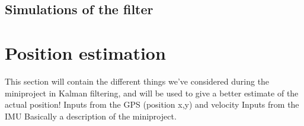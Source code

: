 \subsection{Simulations of the filter}

\section{Position estimation}
This section will contain the different things we've considered during the miniproject in Kalman filtering, and will be used to give a better estimate of the actual position!
Inputs from the \ac{GPS} (position x,y) and velocity
Inputs from the \ac{IMU}
Basically a description of the miniproject. 